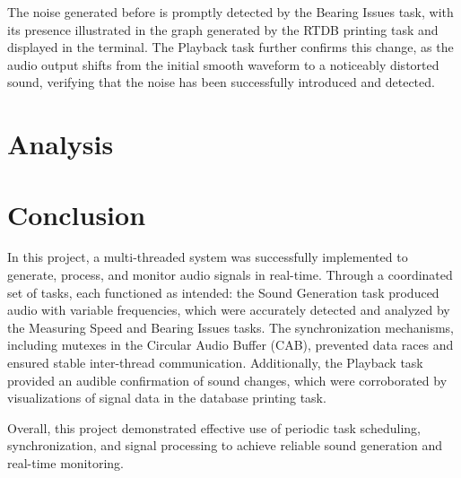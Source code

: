 \documentclass[a4paper,12pt]{article}
\begin{document}
The noise generated before is promptly detected by the Bearing Issues task, with its presence illustrated in the graph generated by the RTDB printing task and displayed in the terminal. The Playback task further confirms this change, as the audio output shifts from the initial smooth waveform to a noticeably distorted sound, verifying that the noise has been successfully introduced and detected.

\section{Analysis}




\section{Conclusion}
In this project, a multi-threaded system was successfully implemented to generate, process, and monitor audio signals in real-time. Through a coordinated set of tasks, each functioned as intended: the Sound Generation task produced audio with variable frequencies, which were accurately detected and analyzed by the Measuring Speed and Bearing Issues tasks. The synchronization mechanisms, including mutexes in the Circular Audio Buffer (CAB), prevented data races and ensured stable inter-thread communication. Additionally, the Playback task provided an audible confirmation of sound changes, which were corroborated by visualizations of signal data in the database printing task.

Overall, this project demonstrated effective use of periodic task scheduling, synchronization, and signal processing to achieve reliable sound generation and real-time monitoring. 
\end{document}
